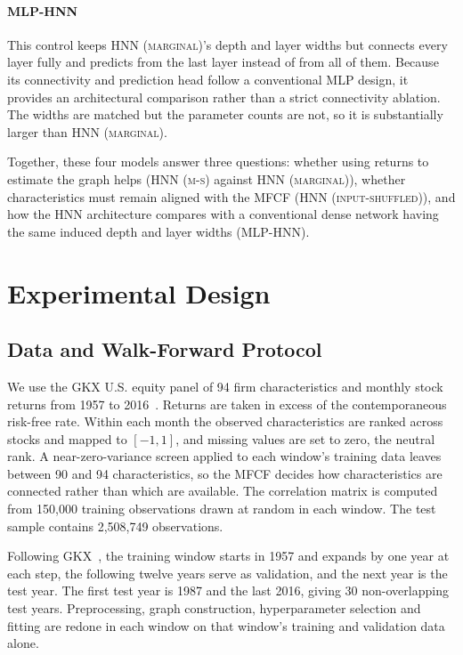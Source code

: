 \documentclass[sigconf,nonacm]{acmart}
\newcommand{\NTest}{2,508,749}
\newcommand{\HNNMarg}{\textsc{HNN (marginal)}}
\newcommand{\HNNMS}{\textsc{HNN (m-s)}}
\newcommand{\HNNShuffle}{\textsc{HNN (input-shuffled)}}
\newcommand{\MLPHNN}{\textsc{MLP-HNN}}
\begin{document}
\paragraph{\MLPHNN}
This control keeps \HNNMarg{}'s depth and layer widths but connects every layer
fully and predicts from the last layer instead of from all of them. Because its connectivity and prediction head follow a conventional
MLP design, it provides an architectural comparison rather than a strict
connectivity ablation. The widths are matched but the parameter counts are not,
so it is substantially larger than \HNNMarg{}.

Together, these four models answer three questions: whether using returns to
estimate the graph helps (\HNNMS{} against \HNNMarg{}), whether characteristics must remain aligned with the MFCF (\HNNShuffle{}), and how the HNN architecture compares with a conventional dense network having the same
induced depth and layer widths (\MLPHNN{}).



\section{Experimental Design}
\label{exp}

\subsection{Data and Walk-Forward Protocol}

We use the GKX U.S. equity panel of 94 firm characteristics and monthly stock
returns from 1957 to 2016~\cite{gu2020}. Returns are taken in excess of the
contemporaneous risk-free rate. Within each month the observed characteristics
are ranked across stocks and mapped to \([-1,1]\), and missing values are set to
zero, the neutral rank. A near-zero-variance screen applied to each window's
training data leaves between 90 and 94 characteristics, so the MFCF decides
how characteristics are connected rather than which are available. The correlation matrix is computed from 150{,}000 training observations drawn at
random in each window.
The test sample contains \NTest{} observations.


Following GKX~\cite{gu2020}, the training window starts in 1957 and expands
by one year at each step, the following twelve years serve as validation, and
the next year is the test year. The first test year is 1987 and the last 2016,
giving 30 non-overlapping test years. Preprocessing, graph construction,
hyperparameter selection and fitting are redone in each window on that window's
training and validation data alone.
\end{document}

